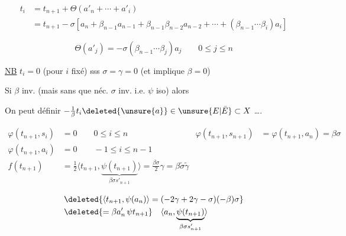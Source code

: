 \[
\begin{aligned}
t_i&=t_{n+1}+\Theta(a'_n+\cdots+a'_i)\\
&=t_{n+1}-\sigma[a_n+\beta_{n-1}a_{n-1}+\beta_{n-1}\beta_{n-2}a_{n-2}+\cdots+(\beta_{n-1}\cdots\beta_i)a_i]
\end{aligned}
\]

\[
\Theta(a'_j)=-\sigma(\beta_{n-1}\cdots\beta_j)a_j\qquad0\le j\le n
\]

\uline{NB} $t_i=0$ (pour $i$ fixé) sss $\sigma=\gamma=0$ (et  implique $\beta=0$)

Si $\beta$ inv. (mais sans que néc. $\sigma$ inv. i.e. $\psi$ iso) alors

On peut définir $-\frac{1}{\beta}t_i\deleted{\unsure{a}}\in\unsure{E|\bar E}\subset X$ \ldots.

\[
\begin{aligned}
\varphi(t_{n+1},s_i)&=0\qquad0\le i\le n&\varphi(t_{n+1},s_{n+1})&=\varphi(t_{n+1},a_n)=\beta\sigma\\
\varphi(t_{n+1},a_i)&=0\qquad-1\le i\le n-1\\
f(t_{n+1})&=\tfrac12\langle t_{n+1},\underbrace{\psi(t_{n+1})}_{\beta\sigma s'_{n+1}}\rangle=\frac{\beta\sigma}{2}\gamma=\beta\widetilde{\sigma}\widetilde{\gamma}
\end{aligned}
\]

\[
\begin{aligned}
&\deleted{\langle t_{n+1},\psi(a_n)\rangle=(-2\gamma+2\gamma-\sigma)(-\beta)\sigma}\\
&\deleted{=\beta a'_n\,\psi t_{n+1}}\quad\langle a_n,\underbrace{\psi(t_{n+1})}_{\beta\sigma s'_{n+1}}\rangle
\end{aligned}
\]


